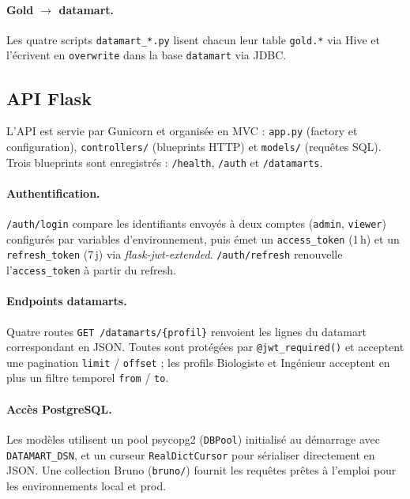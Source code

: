 \documentclass[11pt,a4paper]{article}
\begin{document}
\paragraph{Gold $\rightarrow$ datamart.} Les quatre scripts \texttt{datamart\_*.py} lisent chacun leur table \texttt{gold.*} via Hive et l'écrivent en \texttt{overwrite} dans la base \texttt{datamart} via JDBC.

\subsection{API Flask}

L'API est servie par Gunicorn et organisée en MVC : \texttt{app.py} (factory et configuration), \texttt{controllers/} (blueprints HTTP) et \texttt{models/} (requêtes SQL). Trois blueprints sont enregistrés : \texttt{/health}, \texttt{/auth} et \texttt{/datamarts}.

\paragraph{Authentification.} \texttt{/auth/login} compare les identifiants envoyés à deux comptes (\texttt{admin}, \texttt{viewer}) configurés par variables d'environnement, puis émet un \texttt{access\_token} (1\,h) et un \texttt{refresh\_token} (7\,j) via \textit{flask-jwt-extended}. \texttt{/auth/refresh} renouvelle l'\texttt{access\_token} à partir du refresh.

\paragraph{Endpoints datamarts.} Quatre routes \texttt{GET /datamarts/\{profil\}} renvoient les lignes du datamart correspondant en JSON. Toutes sont protégées par \texttt{@jwt\_required()} et acceptent une pagination \texttt{limit} / \texttt{offset} ; les profils Biologiste et Ingénieur acceptent en plus un filtre temporel \texttt{from} / \texttt{to}.

\paragraph{Accès PostgreSQL.} Les modèles utilisent un pool psycopg2 (\texttt{DBPool}) initialisé au démarrage avec \texttt{DATAMART\_DSN}, et un curseur \texttt{RealDictCursor} pour sérialiser directement en JSON. Une collection Bruno (\texttt{bruno/}) fournit les requêtes prêtes à l'emploi pour les environnements local et prod.
\end{document}
